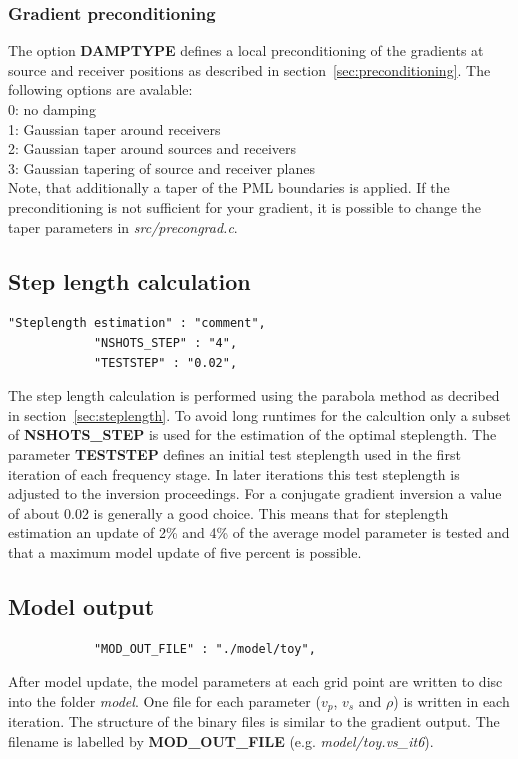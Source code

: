 \subsubsection*{Gradient preconditioning}
The option \textbf{DAMPTYPE} defines a local preconditioning of the gradients at source and receiver positions as described in section~\ref{sec:preconditioning}. The following options are avalable:\\
0: no damping\\
1: Gaussian taper around receivers\\
2: Gaussian taper around sources and receivers\\
3: Gaussian tapering of source and receiver planes\\
Note, that additionally a taper of the PML boundaries is applied. If the preconditioning is not sufficient for your gradient, it is possible to change the taper parameters in \textit{src/precongrad.c}. 
\subsection{Step length calculation}
\begin{verbatim}
"Steplength estimation" : "comment",
			"NSHOTS_STEP" : "4",
			"TESTSTEP" : "0.02",
\end{verbatim}

The step length calculation is performed using the parabola method as decribed in section~\ref{sec:steplength}. To avoid long runtimes for the calcultion only a subset of \textbf{NSHOTS\_STEP} is used for the estimation of the optimal steplength. The parameter \textbf{TESTSTEP} defines an initial test steplength used in the first iteration of each frequency stage. In later iterations this test steplength is adjusted to the inversion proceedings. For a conjugate gradient inversion a value of about 0.02 is generally a good choice. This means that for steplength estimation an update of 2\% and 4\% of the average model parameter is tested and that a maximum model update of five percent is possible.
\subsection{Model output}
\begin{verbatim}
			"MOD_OUT_FILE" : "./model/toy",
\end{verbatim}

After model update, the model parameters at each grid point are written to disc into the folder \textit{model}. One file for each parameter ($v_p$, $v_s$ and $\rho$) is written in each iteration. The structure of the binary files is similar to the gradient output. The filename is labelled by \textbf{MOD\_OUT\_FILE} (e.g. \textit{model/toy.vs\_it6}).  
